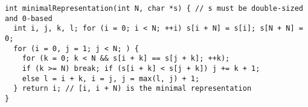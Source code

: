 \begin{lstlisting}
int minimalRepresentation(int N, char *s) { // s must be double-sized and 0-based
  int i, j, k, l; for (i = 0; i < N; ++i) s[i + N] = s[i]; s[N + N] = 0;
  for (i = 0, j = 1; j < N; ) {
    for (k = 0; k < N && s[i + k] == s[j + k]; ++k);
    if (k >= N) break; if (s[i + k] < s[j + k]) j += k + 1;
    else l = i + k, i = j, j = max(l, j) + 1;
  } return i; // [i, i + N) is the minimal representation
}

\end{lstlisting}